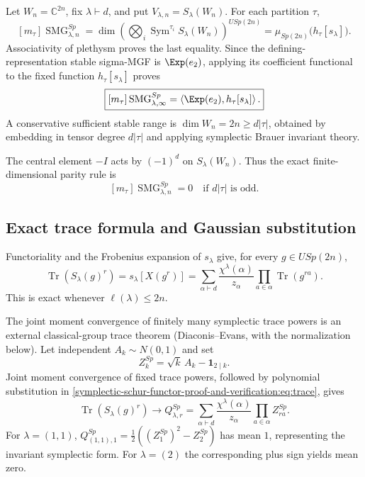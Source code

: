 \documentclass[10pt]{article}
\newcommand{\Sym}{\operatorname{Sym}}
\newcommand{\Tr}{\operatorname{Tr}}
\newcommand{\SMG}{\operatorname{SMG}}
\newcommand{\MGF}{\SMG}
\begin{document}
Let $W_n=\mathbb C^{2n}$, fix $\lambda\vdash d$, and put $V_{\lambda,n}=S_\lambda(W_n)$. For each partition $\tau$,
\begin{equation}\label{symplectic-schur-functor-proof-and-verification:eq:coeff}
 [m_\tau]\MGF^{Sp}_{\lambda,n}
 =\dim\left(\bigotimes_i\Sym^{\tau_i}S_\lambda(W_n)\right)^{USp(2n)}
 =\mu_{Sp(2n)}\bigl(h_\tau[s_\lambda]\bigr).
\end{equation}
Associativity of plethysm proves the last equality. Since the defining-representation stable sigma-MGF is $\Exp(e_2)$, applying its coefficient functional to the fixed function $h_\tau[s_\lambda]$ proves
\begin{equation}\label{symplectic-schur-functor-proof-and-verification:eq:push}
 \boxed{[m_\tau]\MGF^{Sp}_{\lambda,\infty}
 =\left\langle\Exp(e_2),h_\tau[s_\lambda]\right\rangle.}
\end{equation}
A conservative sufficient stable range is $\dim W_n=2n\ge d|\tau|$, obtained by embedding in tensor degree $d|\tau|$ and applying symplectic Brauer invariant theory.

The central element $-I$ acts by $(-1)^d$ on $S_\lambda(W_n)$. Thus the exact finite-dimensional parity rule is
\begin{equation}\label{symplectic-schur-functor-proof-and-verification:eq:parity}
 \boxed{[m_\tau]\MGF^{Sp}_{\lambda,n}=0\quad\text{if }d|\tau|\text{ is odd}.}
\end{equation}

\subsection{Exact trace formula and Gaussian substitution}
Functoriality and the Frobenius expansion of $s_\lambda$ give, for every $g\in USp(2n)$,
\begin{equation}\label{symplectic-schur-functor-proof-and-verification:eq:trace}
 \boxed{\Tr(S_\lambda(g)^r)=s_\lambda[X(g^r)]
 =\sum_{\alpha\vdash d}\frac{\chi^\lambda(\alpha)}{z_\alpha}
 \prod_{a\in\alpha}\Tr(g^{ra}).}
\end{equation}
This is exact whenever $\ell(\lambda)\le2n$.

The joint moment convergence of finitely many symplectic trace powers is an
external classical-group trace theorem (Diaconis--Evans, with the
normalization below).  Let independent $A_k\sim N(0,1)$ and set
\begin{equation}
 Z_k^{Sp}=\sqrt{k}\,A_k-\mathbf1_{2\mid k}.
\end{equation}
Joint moment convergence of fixed trace powers, followed by polynomial substitution in \eqref{symplectic-schur-functor-proof-and-verification:eq:trace}, gives
\begin{equation}
 \Tr(S_\lambda(g)^r)\longrightarrow Q^{Sp}_{\lambda,r}
 =\sum_{\alpha\vdash d}\frac{\chi^\lambda(\alpha)}{z_\alpha}\prod_{a\in\alpha}Z_{ra}^{Sp}.
\end{equation}
For $\lambda=(1,1)$,
$Q^{Sp}_{(1,1),1}=\tfrac12((Z_1^{Sp})^2-Z_2^{Sp})$ has mean $1$, representing the invariant symplectic form. For $\lambda=(2)$ the corresponding plus sign yields mean zero.
\end{document}
